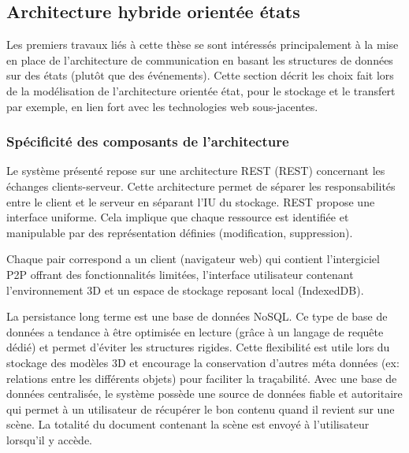 \subsection{Architecture hybride \og orientée états\fg{}}
\label{sec:comm_state}

Les premiers travaux liés à cette thèse \cite{Desprat2015a,Desprat2015b} se sont 
intéressés principalement à la mise en place de l'architecture de communication 
en basant les structures de données sur des états (plutôt que des événements). 
Cette section décrit les choix fait lors de la modélisation de l'architecture \og 
orientée état\fg{}, pour le stockage et le transfert par exemple, en lien fort avec les 
technologies web sous-jacentes.  
%
%
%
%
%  
\subsubsection{Spécificité des composants de l'architecture}
Le système présenté repose sur une architecture \acrshort{REST} 
(\acrlong{REST}) concernant les échanges clients-serveur. Cette architecture 
permet de séparer les responsabilités entre le client et le serveur en séparant 
l'\gls{IU} du stockage. \gls{REST} propose une interface uniforme. Cela implique 
que chaque ressource est identifiée et manipulable par des représentation définies 
(modification, suppression). 

Chaque pair correspond a un client (navigateur web) qui contient l'intergiciel 
\gls{P2P} offrant des fonctionnalités limitées, l'interface utilisateur contenant 
l'environnement \gls{3D} et un espace de stockage reposant local (IndexedDB).

La persistance long terme est une base de données NoSQL. Ce type de base de 
données a tendance à être optimisée en lecture (grâce à un 
langage de requête dédié) et permet d'éviter les 
structures rigides. Cette flexibilité est utile lors du stockage des modèles \gls{3D} 
et 
encourage la conservation d'autres méta données (ex: relations entre les différents 
objets) pour faciliter la traçabilité. 
Avec une base de données centralisée, le système possède une source de 
données fiable et autoritaire qui permet à un utilisateur de récupérer le bon contenu 
quand il revient sur une scène. La totalité du document contenant la scène est 
envoyé à l'utilisateur lorsqu'il y accède.


